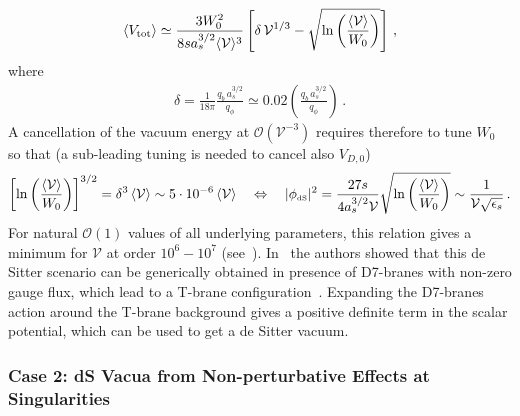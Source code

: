 \documentclass[12pt,a4paper]{book}
\def\dS{{\scriptscriptstyle \rm dS}}
\newcommand{\mc}{\mathcal}
\begin{document}
\begin{align}
\langle V_{\rm tot} \rangle \simeq \frac{3 W_0^2}{8s a_s^{3/2}\langle\mathcal{V}\rangle^3}\left[\delta\, \mathcal{V}^{1/3}
-\sqrt{\ln\left(\frac{\langle\mathcal{V}\rangle}{W_0}\right)}\right]\,,
\label{VTOTfin}
\end{align}
where
\begin{align}
\delta = \frac{1}{18\pi}\frac{q_b\,a_s^{3/2}}{q_\phi} \simeq 0.02 \left(\frac{q_b\,a_s^{3/2}}{q_\phi}\right)\,.
\end{align}
A cancellation of the vacuum energy at $\mc{O}(\mathcal{V}^{-3})$ requires therefore to tune $W_0$ so that
(a sub-leading tuning is needed to cancel also $V_{D,0}$)
\begin{align}
\left[\ln\left(\frac{\langle\mathcal{V}\rangle}{W_0}\right)\right]^{3/2}= \delta^3\, \langle\mathcal{V}\rangle \sim 5\cdot 10^{-6}\, \langle\mathcal{V}\rangle\quad\Leftrightarrow\quad
|\phi_\dS|^2 = \frac{27 s}{4 a_s^{3/2}\mathcal{V}}\sqrt{\ln\left(\frac{\langle\mathcal{V}\rangle}{W_0}\right)}\sim \frac{1}{\mathcal{V}\sqrt{\epsilon_s}}\,.
\label{CCconddS1}
\end{align}
For natural $\mc{O}(1)$ values of all underlying parameters, this relation gives a minimum for $\mathcal{V}$ at order $10^6 - 10^7$ (see~\cite{Cicoli:2012vw}). In~\cite{Cicoli:2015ylx} the authors showed that this de Sitter scenario can be generically obtained in presence of D7-branes with non-zero gauge flux, which lead to a T-brane configuration~\cite{Cecotti:2010bp}. Expanding the D7-branes action around the T-brane background gives a positive definite term in the scalar potential, which can be used to get a de Sitter vacuum.

\subsubsection{Case 2: dS Vacua from Non-perturbative Effects at Singularities}
\label{sssec:DilatonUplift}
\end{document}
